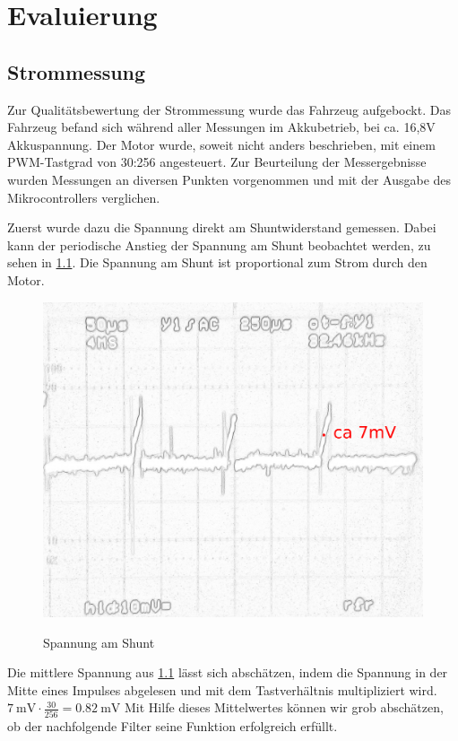 \chapter{Evaluierung}



\section{Strommessung}

Zur Qualitätsbewertung der Strommessung wurde das Fahrzeug aufgebockt. 
Das Fahrzeug befand sich während aller Messungen im Akkubetrieb, bei ca. 16,8V Akkuspannung.
Der Motor wurde, soweit nicht anders beschrieben, mit einem PWM-Tastgrad von 30:256 angesteuert.
Zur Beurteilung der Messergebnisse wurden Messungen an diversen Punkten vorgenommen und mit der Ausgabe des Mikrocontrollers verglichen.

Zuerst wurde dazu die Spannung direkt am Shuntwiderstand gemessen.
Dabei kann der periodische Anstieg der Spannung am Shunt beobachtet werden, zu sehen in \cref{fig:filter_eingang}. Die Spannung am Shunt ist proportional zum Strom durch den Motor.

\begin{figure}[H]
\centering
\includegraphics[width=.8\textwidth]{filter_eingang_mak.png}\\
\caption{Spannung am Shunt}%
\label{fig:filter_eingang}
\end{figure}

Die mittlere Spannung aus \cref{fig:filter_eingang} lässt sich abschätzen, indem die Spannung in der Mitte eines Impulses abgelesen und mit dem Tastverhältnis multipliziert wird.
$\SI{7}{\mV}\cdot\frac{30}{256}=\SI{0,82}{\mV} $
Mit Hilfe dieses Mittelwertes können wir grob abschätzen, ob der nachfolgende Filter seine Funktion erfolgreich erfüllt.


